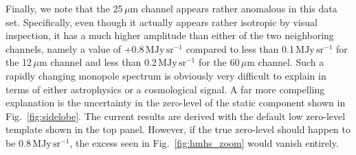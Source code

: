 \documentclass{aa}
\begin{document}
Finally, we note that the 25\,$\mu\mathrm{m}$ channel appears rather
anomalous in this data set. Specifically, even though it actually
appears rather isotropic by visual inspection, it has a much higher
amplitude than either of the two neighboring channels, namely a value
of +0.8\,$\mathrm{MJy\,sr^{-1}}$ compared to less than 0.1\,$\mathrm{MJy\,sr^{-1}}$ for the
12$\,\mu\mathrm{m}$ channel and less than 0.2\,$\mathrm{MJy\,sr^{-1}}$ for the
60$\,\mu\mathrm{m}$ channel. Such a rapidly changing monopole spectrum is
obviously very difficult to explain in terms of either astrophysics or
a cosmological signal. A far more compelling explanation is the
uncertainty in the zero-level of the static component shown in
Fig.~\ref{fig:sidelobe}. The current results are derived with the
default low zero-level template shown in the top panel. However, if
the true zero-level should happen to be 0.8\,$\mathrm{MJy\,sr^{-1}}$, the excess seen
in Fig.~\ref{fig:hmhs_zoom} would vanish entirely.
\end{document}
